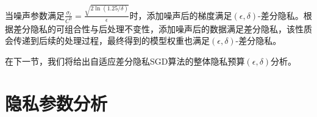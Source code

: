 当噪声参数满足$\frac{\sigma_{l}}{C^{0}}=\frac{\sqrt{2 \ln (1.25 / \delta)}}{\epsilon}$时，添加噪声后的梯度满足$(\epsilon, \delta)$-差分隐私。根据差分隐私的可组合性与后处理不变性，添加噪声后的数据满足差分隐私，该性质会传递到后续的处理过程，最终得到的模型权重也满足$(\epsilon, \delta)$-差分隐私。

在下一节，我们将给出自适应差分隐私SGD算法的整体隐私预算$(\epsilon, \delta)$分析。

\section{隐私参数分析}







